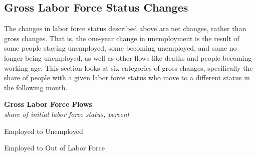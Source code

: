 \documentclass{report}
\newcommand{\lfdateaxisticks}{
		date coordinates in=x, axis line style={draw=none},
		xmin={2018-01-01}, xmax={2022-03-15},   
		xtick={{2018-01-01}, {2019-01-01}, {2020-01-01}, {2021-01-01}, {2022-01-01}},
		enlarge y limits={value=0.12, upper}, enlarge x limits={0.02}, ymin=0,
		yticklabel style={text width=1.0em},
		height=3.8cm, width=6.4cm,
		}
\newcommand{\bbar}[2]{extra #1 ticks = {{#2}}, extra #1 tick labels = ,
		extra #1 tick style = {grid=major, grid style={thick, black!25}},}
\newcommand{\stdline}[4]{\addplot[very thick, no markers, color=#1] 
		table [x=#2, y=#3, col sep=comma] {#4};	}
\newcommand{\rbars}{
		\fill[color=black!10] (axis cs:{1990-07-01},\pgfkeysvalueof{/pgfplots/ymin}) rectangle 
			(axis cs:{1991-03-01}, \pgfkeysvalueof{/pgfplots/ymax});
		\fill[color=black!10] (axis cs:{2007-12-01},\pgfkeysvalueof{/pgfplots/ymin}) rectangle 
			(axis cs:{2009-07-01}, \pgfkeysvalueof{/pgfplots/ymax});
		\fill[color=black!10] (axis cs:{2001-03-01},\pgfkeysvalueof{/pgfplots/ymin}) rectangle 
			(axis cs:{2001-11-01}, \pgfkeysvalueof{/pgfplots/ymax});
		\fill[color=black!10] (axis cs:{2020-02-01},\pgfkeysvalueof{/pgfplots/ymin}) rectangle 
			(axis cs:{2020-05-01}, \pgfkeysvalueof{/pgfplots/ymax});}
\begin{document}
{\subsection*{Gross Labor Force Status Changes}
\begin{minipage}{0.76\textwidth}
\small The changes in labor force status described above are net changes, rather than gross changes. That is, the one-year change in unemployment is the result of some people staying unemployed, some becoming unemployed, and some no longer being unemployed, as well as other flows like deaths and people becoming working age. This section looks at six categories of gross changes, specifically the share of people with a given labor force status who move to a different status in the following month. 
\end{minipage}
\vspace{2mm}

\normalsize \textbf{Gross Labor Force Flows}\\
\footnotesize{\textit{share of initial labor force status, percent}}

\begin{minipage}{0.345\textwidth}
\small Employed to Unemployed\\
\hspace*{-2mm} 
\end{minipage} \hspace{8mm}
\begin{minipage}{0.345\textwidth}
\small Employed to Out of Labor Force\\
\hspace*{-2mm} 
\end{minipage}
\vspace{1mm}

}
\end{document}
